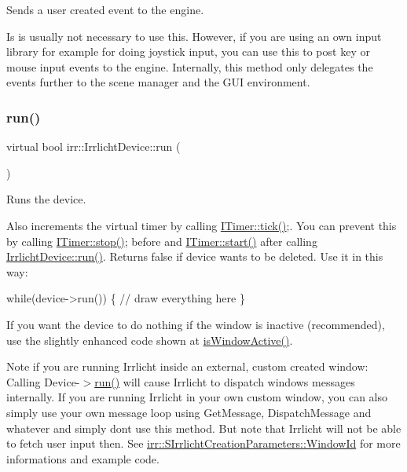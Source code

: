 Sends a user created event to the engine. 

Is is usually not necessary to use this. However, if you are using an own input library for example for doing joystick input, you can use this to post key or mouse input events to the engine. Internally, this method only delegates the events further to the scene manager and the G\+UI environment. \mbox{\label{classirr_1_1IrrlichtDevice_a0489f8151dc43f6f41503ffb5a160b35}} 
\subsubsection{\texorpdfstring{run()}{run()}\hspace{0.1cm}{\footnotesize\ttfamily [1/3]}}
{\footnotesize\ttfamily virtual bool irr\+::\+Irrlicht\+Device\+::run (\begin{DoxyParamCaption}{ }\end{DoxyParamCaption})\hspace{0.3cm}{\ttfamily [pure virtual]}}



Runs the device. 

Also increments the virtual timer by calling \hyperlink{classirr_1_1ITimer_a50ee793711cace4410e1f9c9e1ce20c6}{I\+Timer\+::tick()};. You can prevent this by calling \hyperlink{classirr_1_1ITimer_a649e7294fafc6e6de00f9a4dc6894c16}{I\+Timer\+::stop()}; before and \hyperlink{classirr_1_1ITimer_a9467dc5a72de3869712715d0473c9697}{I\+Timer\+::start()} after calling \hyperlink{classirr_1_1IrrlichtDevice_a0489f8151dc43f6f41503ffb5a160b35}{Irrlicht\+Device\+::run()}. Returns false if device wants to be deleted. Use it in this way\+: 
\begin{DoxyCode}
\textcolor{keywordflow}{while}(device->run())
\{
    \textcolor{comment}{// draw everything here}
\}
\end{DoxyCode}
 If you want the device to do nothing if the window is inactive (recommended), use the slightly enhanced code shown at \hyperlink{classirr_1_1IrrlichtDevice_abd3c88336b739da2694883d5ffd25a70}{is\+Window\+Active()}.

Note if you are running Irrlicht inside an external, custom created window\+: Calling Device-\/$>$\hyperlink{classirr_1_1IrrlichtDevice_a0489f8151dc43f6f41503ffb5a160b35}{run()} will cause Irrlicht to dispatch windows messages internally. If you are running Irrlicht in your own custom window, you can also simply use your own message loop using Get\+Message, Dispatch\+Message and whatever and simply don\textquotesingle{}t use this method. But note that Irrlicht will not be able to fetch user input then. See \hyperlink{structirr_1_1SIrrlichtCreationParameters_a0a26cda9a187b312dc4df26c4e9c52f1}{irr\+::\+S\+Irrlicht\+Creation\+Parameters\+::\+Window\+Id} for more informations and example code. \mbox{\label{classirr_1_1IrrlichtDevice_a0489f8151dc43f6f41503ffb5a160b35}} 
